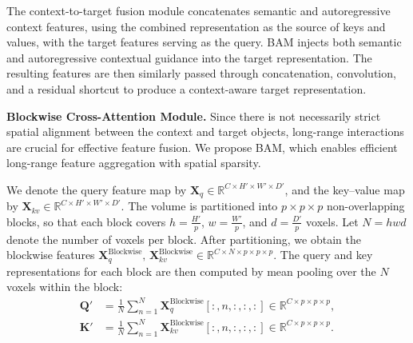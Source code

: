 The context-to-target fusion module concatenates semantic and autoregressive context features, using the combined representation as the source of keys and values, with the target features serving as the query. BAM injects both semantic and autoregressive contextual guidance into the target representation. The resulting features are then similarly passed through concatenation, convolution, and a residual shortcut to produce a context-aware target representation.




\vspace{0.4em}\noindent\textbf{Blockwise Cross-Attention Module.}  
Since there is not necessarily strict spatial alignment between the context and target objects, long-range interactions are crucial for effective feature fusion. We propose BAM, which enables efficient long-range feature aggregation with spatial sparsity.

We denote the query feature map by
$\bm{X}_{q}\!\in\!\mathbb{R}^{C\times H'\times W'\times D'}$, and
the key–value map by
$\bm{X}_{kv}\!\in\!\mathbb{R}^{C\times H'\times W'\times D'}$.
The volume is partitioned into
$p\times p\times p$ non-overlapping blocks,
so that each block covers
$h=\frac{H'}{p}$,
$w=\frac{W'}{p}$,
and
$d=\frac{D'}{p}$ voxels.
Let $N = hwd$ denote the number of voxels per block.
After partitioning, we obtain the blockwise features
$\bm{X}_{q}^{\text{Blockwise}},\, \bm{X}_{kv}^{\text{Blockwise}} \in \mathbb{R}^{C \times N \times p \times p \times p}$.
The query and key representations for each block are then computed by mean pooling over the $N$ voxels within the block:
\begin{align}
\bm{Q}' &= \frac{1}{N} \sum_{n=1}^{N} \bm{X}_{q}^{\text{Blockwise}}[:, n, :, :,:] \in \mathbb{R}^{C\times p\times p\times p}, \\
\bm{K}' &= \frac{1}{N} \sum_{n=1}^{N} \bm{X}_{kv}^{\text{Blockwise}}[:, n, :, :, :] \in \mathbb{R}^{C\times p\times p\times p}.
\end{align}


